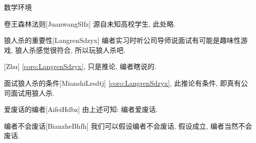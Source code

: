 \documentclass[hyperref, UTF8, CJK, aspectratio=169]{beamer}
\begin{document}
\begin{frame}{数学环境}
\begin{sculemma}{卷王森林法则}[JuanwangSlfz]
		源自未知高校学生, 此处略.
	\end{sculemma}
	\begin{scucorollary}{狼人杀的重要性}[LangrenSdzyx]
		编者实习时听公司导师说面试有可能是趣味性游戏, 狼人杀感觉很符合, 所以玩狼人杀吧.
	\end{scucorollary}
	\begin{scuremark}{}[Zhu]
		\vref{coro:LangrenSdzyx}, 只是推论, 编者瞎说的.
	\end{scuremark}
	\begin{scucondition}{面试狼人杀的条件}[MianshiLrsdtj]
		\vref{coro:LangrenSdzyx}, 此推论有条件, 即真有公司面试用狼人杀.
	\end{scucondition}
	\begin{scuconclusion}{爱废话的编者}[AifeiHdbz]
		由上述可知: 编者爱废话.
	\end{scuconclusion}
	\begin{scuassumption}{编者不会废话}[BianzheBhfh]
		我们可以假设编者不会废话, 假设成立, 编者当然不会废话.
	\end{scuassumption}
\end{frame}
\end{document}
